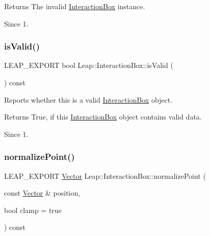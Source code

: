 \begin{DoxyCodeInclude}
\end{DoxyCodeInclude}


\begin{DoxyReturn}{Returns}
The invalid \hyperlink{class_leap_1_1_interaction_box}{Interaction\+Box} instance. 
\end{DoxyReturn}
\begin{DoxySince}{Since}
1. 
\end{DoxySince}
\mbox{\label{class_leap_1_1_interaction_box_afe6398e502c6d38b6150d3512395d0c8}} 
\subsubsection{\texorpdfstring{is\+Valid()}{isValid()}}
{\footnotesize\ttfamily L\+E\+A\+P\+\_\+\+E\+X\+P\+O\+RT bool Leap\+::\+Interaction\+Box\+::is\+Valid (\begin{DoxyParamCaption}{ }\end{DoxyParamCaption}) const}

Reports whether this is a valid \hyperlink{class_leap_1_1_interaction_box}{Interaction\+Box} object.


\begin{DoxyCodeInclude}
\end{DoxyCodeInclude}


\begin{DoxyReturn}{Returns}
True, if this \hyperlink{class_leap_1_1_interaction_box}{Interaction\+Box} object contains valid data. 
\end{DoxyReturn}
\begin{DoxySince}{Since}
1. 
\end{DoxySince}
\mbox{\label{class_leap_1_1_interaction_box_ad0e6082a1e640216b7d705552f09b754}} 
\subsubsection{\texorpdfstring{normalize\+Point()}{normalizePoint()}}
{\footnotesize\ttfamily L\+E\+A\+P\+\_\+\+E\+X\+P\+O\+RT \hyperlink{struct_leap_1_1_vector}{Vector} Leap\+::\+Interaction\+Box\+::normalize\+Point (\begin{DoxyParamCaption}\item[{const \hyperlink{struct_leap_1_1_vector}{Vector} \&}]{position,  }\item[{bool}]{clamp = {\ttfamily true} }\end{DoxyParamCaption}) const}

